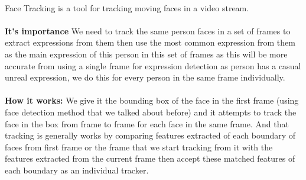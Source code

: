 \paragraph{}
Face Tracking is a tool for tracking moving faces in a video stream.
\paragraph{}
\textbf{It’s importance}\newline
We need to track the same person faces in a set of frames to extract expressions from them then use the most common expression from them as the main expression of this person in this set of frames as this will be more accurate from using a single frame for expression detection as person has a casual unreal expression, we do this for every person in the same frame individually.
\paragraph{}
\textbf{How it works:}\newline
We give it the bounding box of the face in the first frame (using face detection method that we talked about before) and it attempts to track the face in the box from frame to frame for each face in the same frame.\newline
And that tracking is generally works by comparing features extracted of each boundary of faces from first frame or the frame that we start tracking from it with the features extracted from the current frame then accept these matched features of each boundary as an individual tracker.

